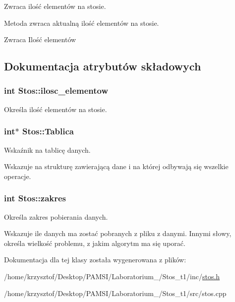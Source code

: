 \-Zwraca ilość elementów na stosie. 

\-Metoda zwraca aktualną ilość elementów na stosie.

\begin{DoxyReturn}{\-Zwraca}
\-Ilość elementów 
\end{DoxyReturn}


\subsection{\-Dokumentacja atrybutów składowych}
\hypertarget{class_stos_a4dd9a9223af0b20cf7582c5ff5dab24a}{
\subsubsection[{ilosc\-\_\-elementow}]{\setlength{\rightskip}{0pt plus 5cm}int {\bf \-Stos\-::ilosc\-\_\-elementow}}}\label{class_stos_a4dd9a9223af0b20cf7582c5ff5dab24a}
\-Określa ilość elementów na stosie. \hypertarget{class_stos_a75e8a31e075c93a0275d069842297081}{
\subsubsection[{\-Tablica}]{\setlength{\rightskip}{0pt plus 5cm}int$\ast$ {\bf \-Stos\-::\-Tablica}}}\label{class_stos_a75e8a31e075c93a0275d069842297081}


\-Wskaźnik na tablicę danych. 

\-Wskazuje na strukturę zawierającą dane i na której odbywają się wszelkie operacje. \hypertarget{class_stos_aa1acdee575ff6bd5fcd2778b2c0fd2df}{
\subsubsection[{zakres}]{\setlength{\rightskip}{0pt plus 5cm}int {\bf \-Stos\-::zakres}}}\label{class_stos_aa1acdee575ff6bd5fcd2778b2c0fd2df}


\-Określa zakres pobierania danych. 

\-Wskazuje ile danych ma zostać pobranych z pliku z danymi. \-Innymi słowy, określa wielkość problemu, z jakim algorytm ma się uporać. 

\-Dokumentacja dla tej klasy została wygenerowana z plików\-:\begin{DoxyCompactItemize}
\item 
/home/krzysztof/\-Desktop/\-P\-A\-M\-S\-I/\-Laboratorium\-\_/\-Stos\-\_\-t1/inc/\hyperlink{stos_8h}{stos.\-h}\item 
/home/krzysztof/\-Desktop/\-P\-A\-M\-S\-I/\-Laboratorium\-\_/\-Stos\-\_\-t1/src/stos.\-cpp\end{DoxyCompactItemize}

